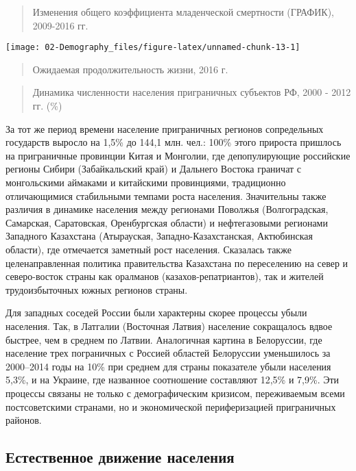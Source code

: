 \documentclass[]{book}
\begin{document}
\begin{quote}
Изменения общего коэффициента младенческой смертности (ГРАФИК),
2009-2016 гг.
\end{quote}

\texttt{[image: 02-Demography\_files/figure-latex/unnamed-chunk-13-1]}

\begin{quote}
Ожидаемая продолжительность жизни, 2016 г.
\end{quote}

\begin{quote}
Динамика численности населения приграничных субъектов РФ, 2000 - 2012
гг. (\%)
\end{quote}

За тот же период времени население приграничных регионов сопредельных
государств выросло на 1,5\% до 144,1 млн. чел.: 100\% этого прироста
пришлось на приграничные провинции Китая и Монголии, где депопулирующие
российские регионы Сибири (Забайкальский край) и Дальнего Востока
граничат с монгольскими аймаками и китайскими провинциями, традиционно
отличающимися стабильными темпами роста населения. Значительны также
различия в динамике населения между регионами Поволжья (Волгоградская,
Самарская, Саратовская, Оренбургская области) и нефтегазовыми регионами
Западного Казахстана (Атырауская, Западно-Казахстанская, Актюбинская
области), где отмечается заметный рост населения. Сказалась также
целенаправленная политика правительства Казахстана по переселению на
север и северо-восток страны как оралманов (казахов-репатриантов), так и
жителей трудоизбыточных южных регионов страны.

Для западных соседей России были характерны скорее процессы убыли
населения. Так, в Латгалии (Восточная Латвия) население сокращалось
вдвое быстрее, чем в среднем по Латвии. Аналогичная картина в
Белоруссии, где население трех пограничных с Россией областей Белоруссии
уменьшилось за 2000--2014 годы на 10\% при среднем для страны показателе
убыли населения 5,3\%, и на Украине, где названное соотношение
составляют 12,5\% и 7,9\%. Эти процессы связаны не только с
демографическим кризисом, переживаемым всеми постсоветскими странами, но
и экономической периферизацией приграничных районов.

\subsection{Естественное движение населения}\label{demo-situ-re}
\end{document}
